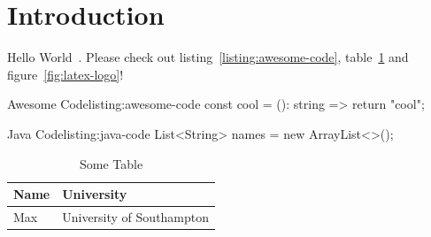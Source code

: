 \documentclass[12pt,a4paper]{article} %
\begin{document}

\newpage
\tableofcontents


\newpage
\renewcommand{\listfigurename}{Figures}
\listoffigures \thispagestyle{fancy}

\newpage
\renewcommand{\listtablename}{Tables}
\listoftables \thispagestyle{fancy}

\newpage
\renewcommand{\lstlistlistingname}{Code Listings}
\lstlistoflistings \thispagestyle{fancy}



\newpage
\section{Introduction}\label{sec:introduction}

Hello World~\cite{React}.
Please check out listing~\ref{listing:awesome-code}, table~\ref{tab:mytable} and figure~\ref{fig:latex-logo}!

\begin{code}{Awesome Code}{listing:awesome-code}
const cool = (): string => {
	return "cool";
}
\end{code}

\begin{code}[java]{Java Code}{listing:java-code}
List<String> names = new ArrayList<>();
\end{code}

\begin{table}[!ht]
	\begin{tabularx}{\textwidth}{|l|X|}
		\hline
		\textbf{Name} & \textbf{University} \\
		\hline
		Max & University of Southampton \\
		\hline
	\end{tabularx}
	\caption{Some Table}
	\label{tab:mytable}
\end{table}
\end{document}
